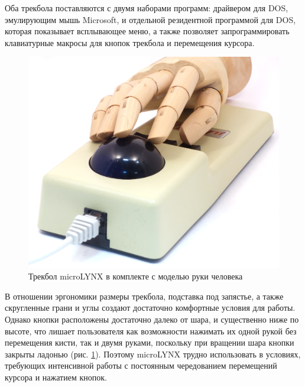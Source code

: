\documentclass[11pt, a4paper]{article}
\begin{document}
Оба трекбола поставляются с двумя наборами программ: драйвером для DOS, эмулирующим мышь Microsoft, и отдельной резидентной программой для DOS, которая показывает всплывающее меню, а также позволяет запрограммировать клавиатурные макросы для кнопок трекбола и перемещения курсора.

\begin{figure}[h]
    \centering
    \includegraphics[scale=0.4]{1986_honeywell_microlynx_trackball/hand_60.jpg}
    \caption{Трекбол microLYNX в комплекте с моделью руки человека}
    \label{fig:microLYNXHand}
\end{figure}

В отношении эргономики размеры трекбола, подставка под запястье, а также скругленные грани и углы создают достаточно комфортные условия для работы. Однако кнопки расположены достаточно далеко от шара, и существенно ниже по высоте, что лишает пользователя как возможности нажимать их одной рукой без перемещения кисти, так и двумя руками, поскольку при вращении шара кнопки закрыты ладонью (рис. \ref{fig:microLYNXHand}). Поэтому microLYNX трудно использовать в условиях, требующих интенсивной работы с постоянным чередованием перемещений курсора и нажатием кнопок.
\end{document}
